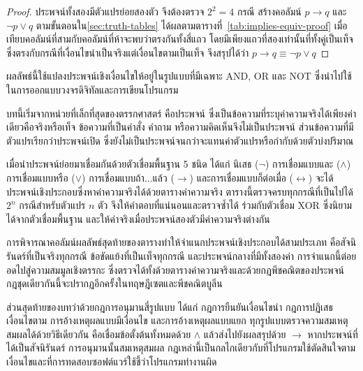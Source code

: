 \begin{proof}
ประพจน์ทั้งสองมีตัวแปรย่อยสองตัว จึงต้องตรวจ $2^2 = 4$ กรณี สร้างคอลัมน์ $p \rightarrow q$ และ $\neg p \lor q$ ตามขั้นตอนใน\autoref{sec:truth-tables} ได้ผลตามตารางที่~\ref{tab:implies-equiv-proof} เมื่อเทียบคอลัมน์ที่สามกับคอลัมน์ที่ห้าจะพบว่าตรงกันทั้งสี่แถว โดยมีเพียงแถวที่สองเท่านั้นที่ทั้งคู่เป็นเท็จ ซึ่งตรงกับกรณีที่เงื่อนไขนำเป็นจริงแต่เงื่อนไขตามเป็นเท็จ จึงสรุปได้ว่า $p \rightarrow q \equiv \neg p \lor q$
\end{proof}

ผลลัพธ์นี้ใช้แปลงประพจน์เชิงเงื่อนไขให้อยู่ในรูปแบบที่มีเฉพาะ AND, OR และ NOT ซึ่งนำไปใช้ในการออกแบบวงจรดิจิทัลและการเขียนโปรแกรม

\label{sec:summary}

บทนี้เริ่มจากหน่วยที่เล็กที่สุดของตรรกศาสตร์ คือประพจน์ ซึ่งเป็นข้อความที่ระบุค่าความจริงได้เพียงค่าเดียวคือจริงหรือเท็จ ข้อความที่เป็นคำสั่ง คำถาม หรือความคิดเห็นจึงไม่เป็นประพจน์ ส่วนข้อความที่มีตัวแปรเรียกว่าประพจน์เปิด ซึ่งยังไม่เป็นประพจน์จนกว่าจะแทนค่าตัวแปรหรือกำกับด้วยตัวบ่งปริมาณ

เมื่อนำประพจน์ย่อยมาเชื่อมกันด้วยตัวเชื่อมพื้นฐาน 5 ชนิด ได้แก่ นิเสธ ($\neg$) การเชื่อมแบบและ ($\land$) การเชื่อมแบบหรือ ($\lor$) การเชื่อมแบบถ้า...แล้ว ($\rightarrow$) และการเชื่อมแบบก็ต่อเมื่อ ($\leftrightarrow$) จะได้ประพจน์เชิงประกอบซึ่งหาค่าความจริงได้ด้วยตารางค่าความจริง ตารางนี้ตรวจครบทุกกรณีที่เป็นไปได้ $2^n$ กรณีสำหรับตัวแปร $n$ ตัว จึงให้คำตอบที่แน่นอนและตรวจซ้ำได้ ร่วมกับตัวเชื่อม XOR ซึ่งนิยามได้จากตัวเชื่อมพื้นฐาน และให้ค่าจริงเมื่อประพจน์สองตัวมีค่าความจริงต่างกัน

การพิจารณาคอลัมน์ผลลัพธ์สุดท้ายของตารางทำให้จำแนกประพจน์เชิงประกอบได้สามประเภท คือสัจนิรันดร์ที่เป็นจริงทุกกรณี ข้อขัดแย้งที่เป็นเท็จทุกกรณี และประพจน์กลางที่มีทั้งสองค่า การจำแนกนี้ต่อยอดไปสู่ความสมมูลเชิงตรรกะ ซึ่งตรวจได้ทั้งด้วยตารางค่าความจริงและด้วยกฎพีชคณิตของประพจน์ กฎชุดเดียวกันนี้จะปรากฏอีกครั้งในทฤษฎีเซตและพีชคณิตบูลีน

ส่วนสุดท้ายของบทว่าด้วยกฎการอนุมานสี่รูปแบบ ได้แก่ กฎการยืนยันเงื่อนไขนำ กฎการปฏิเสธเงื่อนไขตาม การอ้างเหตุผลแบบมีเงื่อนไข และการอ้างเหตุผลแบบแยก ทุกรูปแบบตรวจความสมเหตุสมผลได้ด้วยวิธีเดียวกัน คือเชื่อมข้อตั้งต้นทั้งหมดด้วย $\land$ แล้วส่งไปยังผลสรุปด้วย $\rightarrow$ หากประพจน์ที่ได้เป็นสัจนิรันดร์ การอนุมานนั้นสมเหตุสมผล กฎเหล่านี้เป็นกลไกเดียวกับที่โปรแกรมใช้ตัดสินใจตามเงื่อนไขและที่การทดสอบซอฟต์แวร์ใช้ชี้ว่าโปรแกรมทำงานผิด~\parencite{rosen2019discrete}

